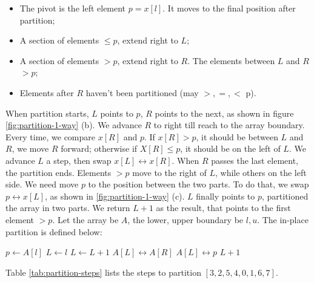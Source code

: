 \documentclass[b5paper]{article}
\begin{document}
\begin{itemize}
\item The pivot is the left element $p = x[l]$. It moves to the final position after partition;
\item A section of elements $\leq p$, extend right to $L$;
\item A section of elements $> p$, extend right to $R$. The elements between $L$ and $R$ $> p$;
\item Elements after $R$ haven't been partitioned (may $>, =, <$ p).
\end{itemize}

When partition starts, $L$ points to $p$, $R$ points to the next, as shown in figure \ref{fig:partition-1-way} (b). We advance $R$ to right till reach to the array boundary. Every time, we compare $x[R]$ and $p$. If $x[R] > p$, it should be between $L$ and $R$, we move $R$ forward; otherwise if $X[R] \leq p$, it should be on the left of $L$. We advance $L$ a step, then swap $x[L] \leftrightarrow x[R]$. When $R$ passes the last element, the partition ends. Elements $> p$ move to the right of $L$, while others on the left side. We need move $p$ to the position between the two parts. To do that, we swap $p \leftrightarrow x[L]$, as shown in \ref{fig:partition-1-way} (c). $L$ finally points to $p$, partitioned the array in two parts. We return $L + 1$ as the result, that points to the first element $> p$. Let the array be $A$, the lower, upper boundary be $l, u$. The in-place partition is defined below:

\begin{algorithmic}[1]
  \State $p \gets A[l]$  
  \State $L \gets l$ 
   
      \State $L \gets L + 1$
      \State {} $A[L] \leftrightarrow A[R]$
    \EndIf
  \EndFor
  \State {} $A[L] \leftrightarrow p$
  \State \Return $L + 1$ 
\EndFunction
\end{algorithmic}

Table \ref{tab:partition-steps} lists the steps to partition $[3, 2, 5, 4, 0, 1, 6, 7]$.
\end{document}
